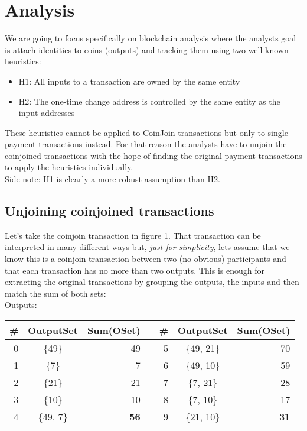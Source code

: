 \documentclass[10pt]{article}
\begin{document}
\section{Analysis}

We are going to focus specifically on blockchain analysis where the analysts goal is attach identities to coins (outputs) and tracking them using two well-known heuristics:
 
\begin{itemize}
  \item H1: All inputs to a transaction are owned by the same entity
  \item H2: The  one-time  change  address  is  controlled  by
the same entity as the input addresses
\end{itemize}


These heuristics cannot be applied to CoinJoin transactions but only to single payment transactions instead. For that reason the analysts have to unjoin the coinjoined transactions with the hope of finding the original payment transactions to apply the heuristics individually.\\

Side note: H1 is clearly a more robust assumption than H2.

\subsection{Unjoining coinjoined transactions}
Let's take the coinjoin transaction in figure 1. That transaction can be interpreted in many different ways but, \textit{just for simplicity}, lets assume that we know this is a coinjoin transaction between two (no obvious) participants and that each transaction has no more than two outputs. This is enough for extracting the original transactions by grouping the outputs, the inputs and then match the sum of both sets: \\

Outputs:

\begin{tabular}{| r | c | r | l | r | c | r |}
  \hline			
  \# & OutputSet & Sum(OSet) & & \# & OutputSet & Sum(OSet) \\
  \hline
  0 & \{49\} & 49 & & 5 & \{49, 21\} & 70 \\
  1 & \{7\} & 7 & & 6 & \{49, 10\} & 59 \\
  2 & \{21\} & 21 & & 7 & \{7, 21\} & 28 \\
  3 & \{10\} & 10 & & 8 & \{7, 10\} & 17 \\
  4 & \{49, 7\} & \textbf{56} & & 9 & \{21, 10\} & \textbf{31} \\
  \hline  
\end{tabular}\\\\
\end{document}
